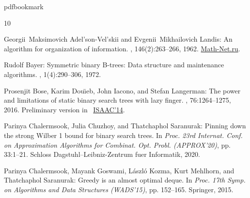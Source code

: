 \newcommand{\prelim}{Preliminary version in\ }\newcommand{\prelims}{Preliminary
  versions in\ }
\providecommand{\bibhead}[1]{}
\expandafter\ifx\csname pdfbookmark\endcsname\relax%
  \providecommand{\tocrefpdfbookmark}{}
\else\providecommand{\tocrefpdfbookmark}{%
   \hypertarget{tocreferences}{}%
   \pdfbookmark[1]{References}{tocreferences}}%
\fi

\tocrefpdfbookmark
\begin{thebibliography}{10}

\bibhead{avl}
{\sc Georgii~Maksimovich Adel'son-Vel'skii and Evgenii~Mikhailovich Landis}: An
  algorithm for organization of information.
, 146(2):263--266, 1962.
\newblock
  \href{https://www.mathnet.ru/php/archive.phtml?wshow=paper&jrnid=dan&paperid=26964&option_lang=eng}{Math-Net.ru}.

\bibhead{Bayer1972}
{\sc Rudolf Bayer}: Symmetric binary {B}-trees: {D}ata structure and
  maintenance algorithms.
, 1(4):290--306, 1972.
\newblock [\epfmtdoi{10.1007/BF00289509}]

\bibhead{BoseDIL14}
{\sc Prosenjit Bose, Karim Dou{\"{\i}}eb, John Iacono, and Stefan Langerman}:
  The power and limitations of static binary search trees with lazy finger.
, 76:1264--1275, 2016.
\newblock \prelim
  \href{https://doi.org/10.1007/978-3-319-13075-0\_15}{ISAAC'14}.
\newblock [\epfmtdoi{10.1007/s00453-016-0224-x}]

\bibhead{conf-version}
{\sc Parinya Chalermsook, Julia Chuzhoy, and Thatchaphol Saranurak}: Pinning
  down the strong {W}ilber 1 bound for binary search trees.
\newblock In {\em Proc. 23rd Internat. Conf. on Approximation Algorithms for
  Combinat. Opt. Probl. (APPROX'20)}, pp. 33:1--21. Schloss
  Dagstuhl--Leibniz-Zentrum fuer Informatik, 2020.

\bibhead{our_wads}
{\sc Parinya Chalermsook, Mayank Goswami, L{\'a}szl{\'o} Kozma, Kurt Mehlhorn,
  and Thatchaphol Saranurak}: Greedy is an almost optimal deque.
\newblock In {\em Proc. 17th Symp. on Algorithms and Data Structures
  (WADS'15)}, pp. 152--165. Springer, 2015.
\newblock [\epfmtdoi{10.1007/978-3-319-21840-3\_13}]


\end{thebibliography}
